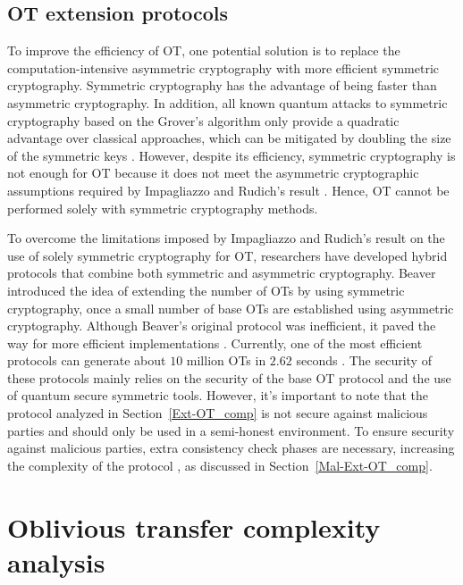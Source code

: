\subsection{OT extension protocols} \label{Ext-OT}

To improve the efficiency of OT, one potential solution is to replace the computation-intensive asymmetric cryptography with more efficient symmetric cryptography. Symmetric cryptography has the advantage of being faster than asymmetric cryptography. In addition, all known quantum attacks to symmetric cryptography based on the Grover's algorithm only provide a quadratic advantage over classical approaches, which can be mitigated by doubling the size of the symmetric keys \cite{Bernstein2017}. However, despite its efficiency, symmetric cryptography is not enough for OT because it does not meet the asymmetric cryptographic assumptions required by Impagliazzo and Rudich's result \cite{IR99}. Hence, OT cannot be performed solely with symmetric cryptography methods.

To overcome the limitations imposed by Impagliazzo and Rudich's result \cite{IR99} on the use of solely symmetric cryptography for OT, researchers have developed hybrid protocols that combine both symmetric and asymmetric cryptography. Beaver \cite{B96} introduced the idea of extending the number of OTs by using symmetric cryptography, once a small number of base OTs are established using asymmetric cryptography. Although Beaver's original protocol was inefficient, it paved the way for more efficient implementations \cite{IKNP03, N07, NNOB12, ALSZ13, ALSZ15}. Currently, one of the most efficient protocols can generate about $10$ million OTs in $2.62$ seconds \cite{ALSZ13}. The security of these protocols mainly relies on the security of the base OT protocol and the use of quantum secure symmetric tools. However, it's important to note that the protocol analyzed in Section~\ref{Ext-OT_comp} \cite{ALSZ13} is not secure against malicious parties and should only be used in a semi-honest environment. To ensure security against malicious parties, extra consistency check phases are necessary, increasing the complexity of the protocol \cite{ALSZ15, KOS15}, as discussed in Section~\ref{Mal-Ext-OT_comp}.



\section{Oblivious transfer complexity analysis} \label{HQOT_comp}

